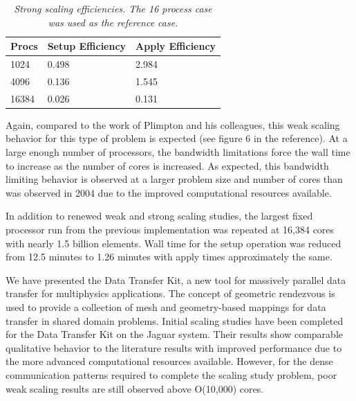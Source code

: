 \documentclass{mc2013}
\begin{document}
\begin{table}[htpb!]
  \begin{center}
    \begin{tabular}{lll}\hline\hline
      \multicolumn{1}{c}{Procs}& 
      \multicolumn{1}{c}{Setup Efficiency} & 
      \multicolumn{1}{c}{Apply Efficiency}\\\hline\hline
      1024 &	0.498 &	2.984 \\
      4096 &	0.136 &	1.545 \\
      16384 &	0.026 &	0.131 \\
      \hline\hline
    \end{tabular}
  \end{center}
  \caption{\sl Strong scaling efficiencies. The 16 process case was used
    as the reference case.}
  \label{tab:strong_efficiency}
\end{table}

Again, compared to the work of Plimpton and his colleagues, this weak
scaling behavior for this type of problem is expected (see figure 6 in
the reference).  At a large enough number of processors, the bandwidth
limitations force the wall time to increase as the number of cores is
increased. As expected, this bandwidth limiting behavior is observed
at a larger problem size and number of cores than was observed in 2004
due to the improved computational resources available.

In addition to renewed weak and strong scaling studies, the largest
fixed processor run from the previous implementation was repeated at
16,384 cores with nearly 1.5 billion elements. Wall time for the setup
operation was reduced from 12.5 minutes to 1.26 minutes with apply
times approximately the same.



We have presented the Data Transfer Kit, a new tool for massively
parallel data transfer for multiphysics applications. The concept of
geometric rendezvous is used to provide a collection of mesh and
geometry-based mappings for data transfer in shared domain problems.
Initial scaling studies have been completed for the Data Transfer Kit
on the Jaguar system. Their results show comparable qualitative
behavior to the literature results with improved performance due to
the more advanced computational resources available. However, for the
dense communication patterns required to complete the scaling study
problem, poor weak scaling results are still observed above O(10,000)
cores.
\end{document}
